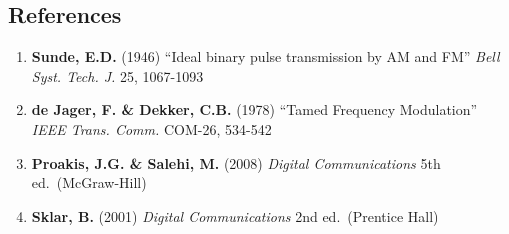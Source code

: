 \subsection{\texorpdfstring{ References}{ References}}\label{references}

\begin{enumerate}
\def\labelenumi{\arabic{enumi}.}
\tightlist
\item
  \textbf{Sunde, E.D.} (1946) ``Ideal binary pulse transmission by AM
  and FM'' \emph{Bell Syst. Tech. J.} 25, 1067-1093
\item
  \textbf{de Jager, F. \& Dekker, C.B.} (1978) ``Tamed Frequency
  Modulation'' \emph{IEEE Trans. Comm.} COM-26, 534-542
\item
  \textbf{Proakis, J.G. \& Salehi, M.} (2008) \emph{Digital
  Communications} 5th ed.~(McGraw-Hill)
\item
  \textbf{Sklar, B.} (2001) \emph{Digital Communications} 2nd
  ed.~(Prentice Hall)
\end{enumerate}

